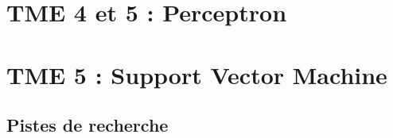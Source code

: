 \documentclass[a4paper,12pt]{article}
\begin{document}
\section{TME 4 et 5 : Perceptron}

\section{TME 5 : Support Vector Machine}


\subsection{Pistes de recherche}



\end{document}

